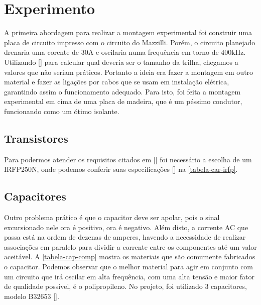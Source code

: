 \chapter{Experimento}
A primeira abordagem para realizar a montagem experimental foi construir uma placa de circuito impresso com o circuito do Mazzilli. Porém, o circuito planejado drenaria uma corente de 30A e oscilaria numa frequência em torno de 400kHz. Utilizando [] para calcular qual deveria ser o tamanho da trilha, chegamos a valores que não seriam práticos. Portanto a ideia era fazer a montagem em outro material e fazer as ligações por cabos que se usam em instalação elétrica, garantindo assim o funcionamento adequado. Para isto, foi feita a montagem experimental em cima de uma placa de madeira, que é um péssimo condutor, funcionando como um ótimo isolante. 
\section{Transistores}
Para podermos atender os requisitos citados em [] foi necessário a escolha de um IRFP250N, onde podemos conferir suas especificações [] na \autoref{tabela-car-irfp}.


\begin{table}[htb]
\end{table}


\section{Capacitores}
Outro problema prático é que o capacitor deve ser apolar, pois o sinal excursionado nele ora é positivo, ora é negativo. Além disto, a corrente AC que passa está na ordem de dezenas de amperes, havendo a necessidade de realizar associações em paralelo para dividir a corrente entre os componentes até um valor aceitável. A \autoref{tabela-cap-comp} mostra os materiais que são comumente fabricados o capacitor. Podemos observar que o melhor material para agir em conjunto com um circuito que irá oscilar em alta frequência, com uma alta tensão e maior fator de qualidade possível, é o polipropileno. No projeto, foi utilizado 3 capacitores, modelo B32653 [].


